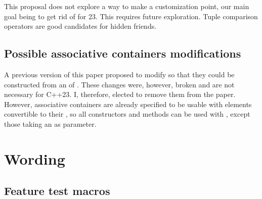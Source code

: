 \documentclass{wg21}
\begin{document}
This proposal does not explore a way to make  a customization point, our main goal being to get rid of  for 23.
This requires future exploration. Tuple comparison operators are good candidates for hidden friends.

\subsection{Possible associative containers modifications}

A previous version of this paper proposed to modify  so that
they could be constructed from an  of .
These changes were, however, broken and are not necessary for C++23. I, therefore, elected to remove them from the paper.
However, associative containers are already specified to be usable with elements convertible to their
, so all constructors and methods can be used with , except those taking an
 as parameter.

\section{Wording}


\subsection{Feature test macros}

\end{document}
